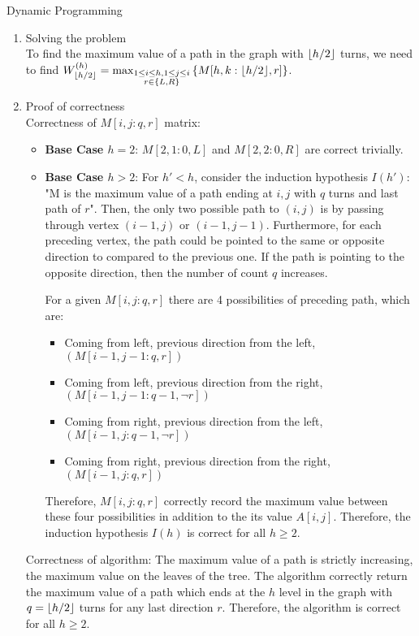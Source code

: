 \documentclass{article}
\numberwithin{table}{section}
\numberwithin{figure}{section}
\begin{document}
\begin{section}{Dynamic Programming}
\begin{enumerate}
\begin{tcolorbox}[breakable]
\begin{enumerate}
            \item Solving the problem \\
            To find the maximum value of a path in the graph with $\lfloor h/2\rfloor$ turns, we need to find $W_{\lfloor h/2\rfloor}^{(h)} = \max_{\substack{1 \leq i \leq h, 1 \leq j \leq i \\ r \in \left\{L,R\right\}}}\left\{M[h, k : \lfloor h/2\rfloor, r]\right\}$. 
            
            \item Proof of correctness \\
            Correctness of $M[i,j : q, r]$ matrix:
            \begin{itemize}
                \item \textbf{Base Case $h=2$}: $M[2,1 : 0, L]$ and $M[2,2 : 0, R]$ are correct trivially. 
                \item \textbf{Base Case $h>2$}: For $h' < h$, consider the induction hypothesis $I(h')$: "M is the maximum value of a path ending at $i, j$ with $q$ turns and last path of $r$". Then, the only two possible path to $(i,j)$ is by passing through vertex $(i-1, j)$ or $(i-1 , j-1)$. Furthermore, for each preceding vertex, the path could be pointed to the same or opposite direction to compared to the previous one. If the path is pointing to the opposite direction, then the number of count $q$ increases. 
                
                For a given $M[i, j : q, r]$ there are 4 possibilities of preceding path, which are:
                \begin{itemize}
                    \item Coming from left, previous direction from the left, $(M[i-1, j-1 : q, r])$
                    \item Coming from left, previous direction from the right, $(M[i-1, j-1 : q-1, \neg r])$
                    \item Coming from right, previous direction from the left, $(M[i-1, j : q-1, \neg r])$
                    \item Coming from right, previous direction from the right, $(M[i-1, j : q, r])$
                \end{itemize}
                Therefore, $M[i, j : q, r]$ correctly record the maximum value between these four possibilities in addition to the its value $A[i,j]$. 
                Therefore, the induction hypothesis $I(h)$ is correct for all $h \geq 2$.
            \end{itemize}
            Correctness of algorithm:
            The maximum value of a path is strictly increasing, the maximum value on the leaves of the tree. The algorithm correctly return the maximum value of a path which ends at the $h$ level in the graph with $q = \lfloor h/2\rfloor$ turns for any last direction $r$.
            Therefore, the algorithm is correct for all $h \geq 2$.
            

\end{enumerate}
\end{tcolorbox}
\end{enumerate}
\end{section}
\end{document}
